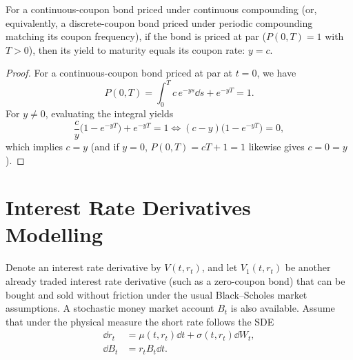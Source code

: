 \begin{theorem}\label{thm:par-bond-ytm}
    For a continuous-coupon bond priced under continuous compounding (or, equivalently, a discrete-coupon bond priced under periodic compounding matching its coupon frequency), if the bond is priced at par ($P(0, T) = 1$ with $T > 0$), then its yield to maturity equals its coupon rate: $y = c$.
\end{theorem}
\begin{proof}
    For a continuous-coupon bond priced at par at $t = 0$, we have
    \[
    P(0, T) = \int_0^T c\,e^{-ys}\dd s + e^{-yT} = 1.
    \]
    For $y \neq 0$, evaluating the integral yields
    \[
    \frac{c}{y}\bigl(1 - e^{-yT}\bigr) + e^{-yT} = 1 \iff (c - y)\bigl(1 - e^{-yT}\bigr) = 0,
    \]
    which implies $c = y$ (and if $y = 0$, $P(0, T) = cT + 1 = 1$ likewise gives $c = 0 = y$).
\end{proof}

\section{Interest Rate Derivatives Modelling}

Denote an interest rate derivative by $V(t, r_t)$, and let $V_1(t, r_t)$ be another already traded interest rate derivative (such as a zero-coupon bond) that can be bought and sold without friction under the usual Black--Scholes market assumptions. A stochastic money market account $B_t$ is also available. Assume that under the physical measure the short rate follows the SDE
\begin{align*}
\dd r_t &= \mu(t, r_t)\dd t + \sigma(t, r_t)\dd W_t, \\
\dd B_t &= r_t B_t\dd t.
\end{align*}

